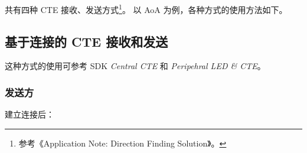 \documentclass[
  12pt,
]{book}
\begin{document}
共有四种 CTE 接收、发送方式\footnote{参考《Application Note: Direction Finding Solution》。}。
以 AoA 为例，各种方式的使用方法如下。

\hypertarget{ux57faux4e8eux8fdeux63a5ux7684-cte-ux63a5ux6536ux548cux53d1ux9001}{%
\subsection{基于连接的 CTE 接收和发送}\label{ux57faux4e8eux8fdeux63a5ux7684-cte-ux63a5ux6536ux548cux53d1ux9001}}

这种方式的使用可参考 SDK \emph{Central CTE} 和 \emph{Peripehral LED \& CTE}。

\hypertarget{ux53d1ux9001ux65b9}{%
\subsubsection{发送方}\label{ux53d1ux9001ux65b9}}

建立连接后：
\end{document}
